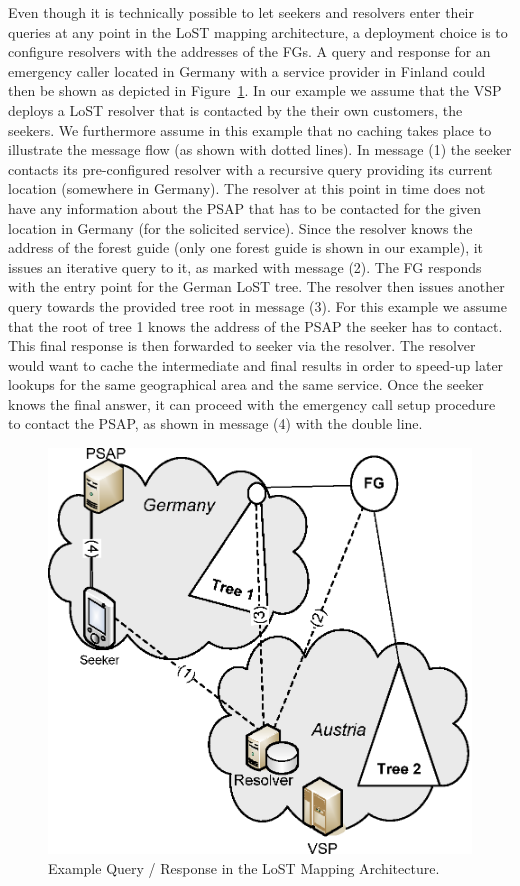 \documentclass[12pt]{article}
\begin{document}
Even though it is technically possible to let seekers and resolvers enter their queries at any point in the LoST mapping architecture, a deployment choice is to configure resolvers with the addresses of the FGs. A query and response for an emergency caller located in Germany with a service provider in Finland could then be shown as depicted in Figure~\ref{lost-example-query-figure}. In our example we assume that the VSP deploys a LoST resolver that is contacted by the their own customers, the seekers. We furthermore assume in this example that no caching takes place to illustrate the message flow (as shown with dotted lines). In message (1) the seeker contacts its pre-configured resolver with a recursive query providing its current location (somewhere in Germany). The resolver at this point in time does not have any information about the PSAP that has to be contacted for the given location in Germany (for the solicited service). Since the resolver knows the address of the forest guide (only one forest guide is shown in our example), it issues an iterative query to it, as marked with message (2). The FG responds with the entry point for the German LoST tree. The resolver then issues another query towards the provided tree root in message (3). For this example we assume that the root of tree 1 knows the address of the PSAP the seeker has to contact. This final response is then forwarded to seeker via the resolver. The resolver would want to cache the intermediate and final results in order to speed-up later lookups for the same geographical area and the same service. Once the seeker knows the final answer, it can proceed with the emergency call setup procedure to contact the PSAP, as shown in message (4) with the double line. 

\begin{figure}[!t]
 \centering
 \includegraphics[scale=0.70]{figures/lost-example-query-figure.eps}
 \caption{Example Query / Response in the LoST Mapping Architecture.}
 \label{lost-example-query-figure}
\end{figure}
\end{document}
